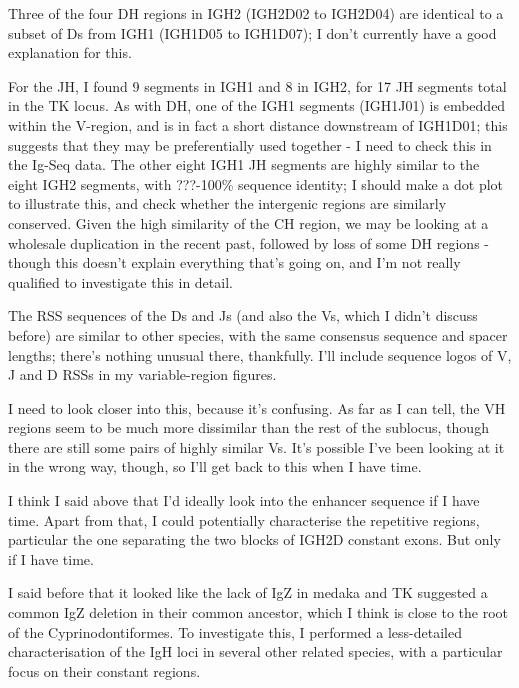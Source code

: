 Three of the four DH regions in IGH2 (IGH2D02 to IGH2D04) are identical to a subset of Ds from IGH1 (IGH1D05 to IGH1D07); I don't currently have a good explanation for this. %

For the JH, I found 9 segments in IGH1 and 8 in IGH2, for 17 JH segments total in the TK locus. As with DH, one of the IGH1 segments (IGH1J01) is embedded within the V-region, and is in fact a short distance downstream of IGH1D01; this suggests that they may be preferentially used together - I need to check this in the Ig-Seq data. The other eight IGH1 JH segments are highly similar to the eight IGH2 segments, with ???-100\% sequence identity; I should make a dot plot to illustrate this, and check whether the intergenic regions are similarly conserved. Given the high similarity of the CH region, we may be looking at a wholesale duplication in the recent past, followed by loss of some DH regions - though this doesn't explain everything that's going on, and I'm not really qualified to investigate this in detail.

The RSS sequences of the Ds and Js (and also the Vs, which I didn't discuss before) are similar to other species, with the same consensus sequence and spacer lengths; there's nothing unusual there, thankfully. I'll include sequence logos of V, J and D RSSs in my variable-region figures.


I need to look closer into this, because it's confusing. As far as I can tell, the VH regions seem to be much more dissimilar than the rest of the sublocus, though there are still some pairs of highly similar Vs. It's possible I've been looking at it in the wrong way, though, so I'll get back to this when I have time.


I think I said above that I'd ideally look into the enhancer sequence if I have time. Apart from that, I could potentially characterise the repetitive regions, particular the one separating the two blocks of IGH2D constant exons. But only if I have time.


I said before that it looked like the lack of IgZ in medaka and TK suggested a common IgZ deletion in their common ancestor, which I think is close to the root of the Cyprinodontiformes. To investigate this, I performed a less-detailed characterisation of the IgH loci in several other related species, with a particular focus on their constant regions.

